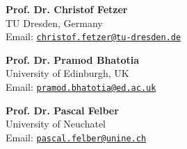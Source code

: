 \documentclass[letterpaper]{article}
\renewenvironment{itemize}{
  \begin{list}{}{
    \setlength{\leftmargin}{1.5em}
  }
}{
  \end{list}
}
\begin{document}
\begin{itemize}

\item {\bf Prof. Dr. Christof Fetzer }  \\
TU Dresden, Germany\\
Email: \href{mailto:christof.fetzer@tu-dresden.de}{\tt christof.fetzer@tu-dresden.de}
      
\item {\bf  Prof. Dr. Pramod Bhatotia }  \\
University of Edinburgh, UK\\
Email: \href{mailto:pramod.bhatotia@ed.ac.uk}{\tt pramod.bhatotia@ed.ac.uk}

\item {\bf Prof. Dr. Pascal Felber} \\
University of Neuchatel\\
Email: \href{mailto:pascal.felber@unine.ch}{\tt pascal.felber@unine.ch}

\end{itemize}
\end{document}
